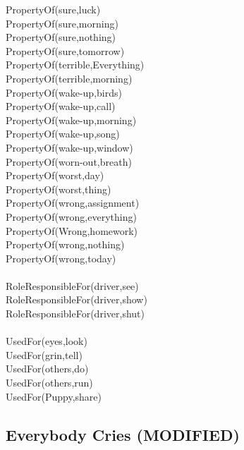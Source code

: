 \begin{multicols}{2}
\begin{footnotesize}
PropertyOf(sure,luck) \\
PropertyOf(sure,morning) \\
PropertyOf(sure,nothing) \\
PropertyOf(sure,tomorrow) \\
PropertyOf(terrible,Everything) \\
PropertyOf(terrible,morning) \\
PropertyOf(wake-up,birds) \\
PropertyOf(wake-up,call) \\
PropertyOf(wake-up,morning) \\
PropertyOf(wake-up,song) \\
PropertyOf(wake-up,window) \\
PropertyOf(worn-out,breath) \\
PropertyOf(worst,day) \\
PropertyOf(worst,thing) \\
PropertyOf(wrong,assignment) \\
PropertyOf(wrong,everything) \\
PropertyOf(Wrong,homework) \\
PropertyOf(wrong,nothing) \\
PropertyOf(wrong,today) \\
~\\
RoleResponsibleFor(driver,see) \\
RoleResponsibleFor(driver,show) \\
RoleResponsibleFor(driver,shut) \\
~\\
UsedFor(eyes,look) \\
UsedFor(grin,tell) \\
UsedFor(others,do) \\
UsedFor(others,run) \\
UsedFor(Puppy,share) \\
\end{footnotesize}
\end{multicols}

\subsection{Everybody Cries (MODIFIED)}

